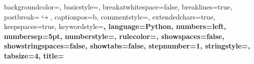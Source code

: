 {
    backgroundcolor=\color{shadecolor},       %
    basicstyle=\ttfamily\footnotesize,        %
    breakatwhitespace=false,                  %
    breaklines=true,                          %
    postbreak=\mbox{\textcolor{black}{$\hookrightarrow$}\space},
    captionpos=b,                             %
    commentstyle=\color{mygreen},             %
    extendedchars=true,                       %
    keepspaces=true,                          %
    keywordstyle=\bfseries\color{blue},       %
    language=Python,                          %
    numbers=left,                             %
    numbersep=5pt,                            %
    numberstyle=\tiny\color{mygray},          %
    rulecolor=\color{black},                  %
    showspaces=false,                         %
    showstringspaces=false,                   %
    showtabs=false,                           %
    stepnumber=1,                             %
    stringstyle=\color{mymauve},              %
    tabsize=4,                                %
    title=\lstname                            %
}

\usepackage{pythonhighlight}

